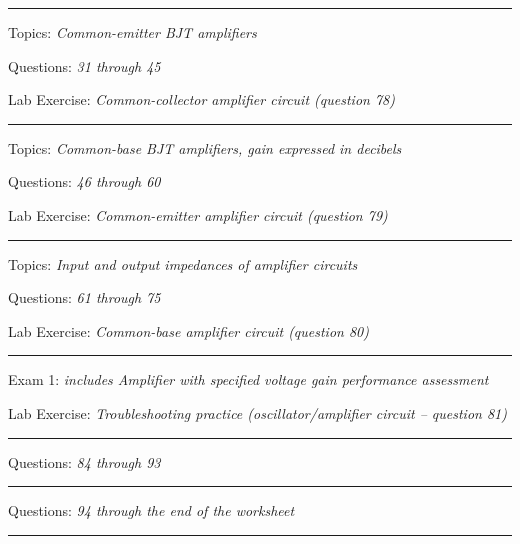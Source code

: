 
\vskip 10pt
\hrule \vskip 5pt
\noindent
{}

\hskip 10pt Topics: {\it Common-emitter BJT amplifiers}
 
\hskip 10pt Questions: {\it 31 through 45}
 
\hskip 10pt Lab Exercise: {\it Common-collector amplifier circuit (question 78)}
 

\vskip 10pt
\hrule \vskip 5pt
\noindent
{}

\hskip 10pt Topics: {\it Common-base BJT amplifiers, gain expressed in decibels}
 
\hskip 10pt Questions: {\it 46 through 60}
 
\hskip 10pt Lab Exercise: {\it Common-emitter amplifier circuit (question 79)}
 

\vskip 10pt
\hrule \vskip 5pt
\noindent
{}

\hskip 10pt Topics: {\it Input and output impedances of amplifier circuits}
 
\hskip 10pt Questions: {\it 61 through 75}
 
\hskip 10pt Lab Exercise: {\it Common-base amplifier circuit (question 80)}
 
\vskip 10pt
\hrule \vskip 5pt
\noindent
{}

\hskip 10pt Exam 1: {\it includes Amplifier with specified voltage gain performance assessment}
 
\hskip 10pt Lab Exercise: {\it Troubleshooting practice (oscillator/amplifier circuit -- question 81)}
  
\vskip 10pt
\hrule \vskip 5pt
\noindent
{}

\hskip 10pt Questions: {\it 84 through 93}
 
\vskip 10pt
\hrule \vskip 5pt
\noindent
{}

\hskip 10pt Questions: {\it 94 through the end of the worksheet}
 
\vskip 10pt
\hrule \vskip 5pt
\noindent
{}

